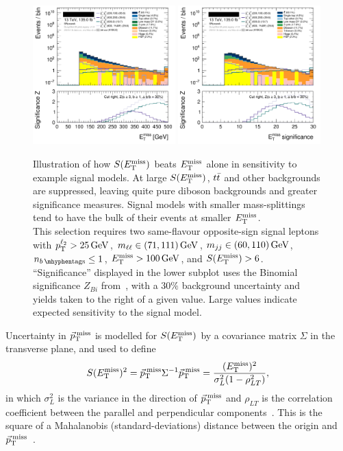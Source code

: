 \begin{figure}[tp]
\centering
\includegraphics[width=0.49\textwidth]{figures/2ljets_presel_met_logy.png}
\hfill
\includegraphics[width=0.49\textwidth]{figures/2ljets_presel_met_sig_logy.png}
\caption{
Illustration of how $\metsig$ beats $\met$ alone in sensitivity to
example signal models.
At large $\metsig$, $\ttbar$ and other backgrounds are suppressed, leaving
quite pure diboson backgrounds and greater significance measures.
Signal models with smaller mass-splittings tend to have the bulk of their
events at smaller $\met$.
\\[0.5em]
This selection requires two same-flavour opposite-sign signal leptons with
$\pt^{\ell_2} > 25\,\eV[G]$,
$\mll \in (71, 111)\,\eV[G]$,
$\mjj \in (60, 110)\,\eV[G]$,
$\nbtag \leq 1$,
$\met > 100\,\eV[G]$, and
$\metsig > 6$.
\\[0.5em]
``Significance'' displayed in the lower subplot uses the Binomial significance
$Z_{Bi}$ from~\cite{cousins2008evaluation}, with a $30\%$ background
uncertainty and yields taken to the right of a given value.
Large values indicate expected sensitivity to the signal model.
}
\label{fig:2ljets_presel_met}
\end{figure}

Uncertainty in $\ptmiss$ is modelled for $\metsig$ by a covariance matrix
$\Sigma$ in the transverse plane, and used to define
\begin{equation}
\metsig^2
=
\ptmiss \Sigma^{-1} \ptmiss
=
\frac{(\met)^2}{\sigma_L^2(1 - \rho_{LT}^2)}
,
\end{equation}
in which $\sigma_L^2$ is the variance in the direction of $\ptmiss$ and
$\rho_{LT}$ is the correlation coefficient between the parallel and
perpendicular components~\cite{atlas_met_significance}.
This is the square of a Mahalanobis (standard-deviations) distance between
the origin and $\ptmiss$~\cite{mahalanobis1936generalised}.

